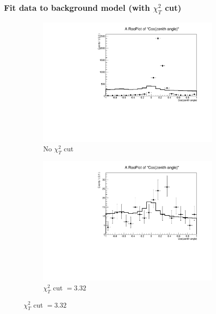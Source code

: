 \documentclass{beamer}
\begin{document}
\begin{frame}
	\frametitle{Fit data to background model (with $\chi^{2}_{T}$ cut)}
	\begin{figure}
		\centering
		\begin{subfigure}[b]{0.49\linewidth}
			\caption*{No $\chi^{2}_{T}$ cut}
			\includegraphics[width=\linewidth]{fit_data_to_bkg_model_noChi2TCut.pdf}
		\end{subfigure}
		\begin{subfigure}[b]{0.49\linewidth}
			\caption*{$\chi^{2}_{T}$ cut $= 3.32$}
			\includegraphics[width=\linewidth]{fit_data_to_bkg_model_3_32Chi2TCut.pdf}
		\end{subfigure}
		
	\end{figure}
\end{frame}
\end{document}
